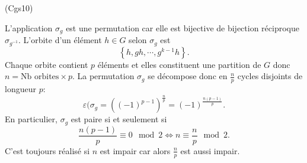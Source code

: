 \begin{tiny}(Cgs10)\end{tiny} L'application $\sigma_g$ est une permutation car elle est bijective de bijection réciproque $\sigma_{g^{-1}}$. L'orbite d'un élément $h\in G$ selon $\sigma_g$ est 
\[
 \left\lbrace h, gh, \cdots, g^{k-1}h \right\rbrace .
\]
Chaque orbite contient $p$ éléments et elles constituent une partition de $G$ donc $n = \text{Nb orbites}\times p$. La permutation $\sigma_g$ se décompose donc en $\frac{n}{p}$ cycles disjoints de longueur $p$:
\[
 \varepsilon(\sigma_g = \left((-1)^{p-1} \right)^{\frac{n}{p}} = (-1)^{\frac{n(p-1)}{p}}. 
\]
En particulier, $\sigma_g$ est paire si et seulement si
\[
 \frac{n(p-1)}{p} \equiv 0 \mod 2 \Leftrightarrow n \equiv \frac{n}{p}\mod 2.
\]
C'est toujours réalisé si $n$ est impair car alors $\frac{n}{p}$ est aussi impair.
